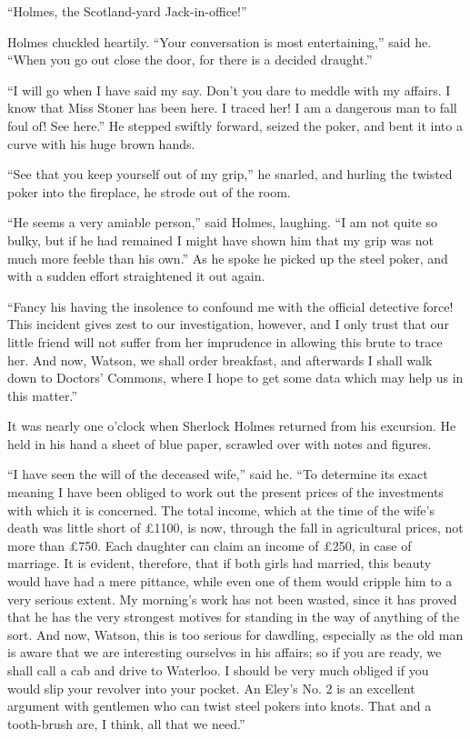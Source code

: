 “Holmes, the Scotland-yard Jack-in-office!”

Holmes chuckled heartily. “Your conversation is most
entertaining,” said he. “When you go out close the door, for
there is a decided draught.”

“I will go when I have said my say. Don’t you dare to
meddle with my affairs. I know that Miss Stoner has been
here. I traced her! I am a dangerous man to fall foul of!
See here.” He stepped swiftly forward, seized the poker, and
bent it into a curve with his huge brown hands.

“See that you keep yourself out of my grip,” he snarled,
and hurling the twisted poker into the fireplace, he strode out
of the room.

“He seems a very amiable person,” said Holmes, laughing.
“I am not quite so bulky, but if he had remained I might
have shown him that my grip was not much more feeble than
his own.” As he spoke he picked up the steel poker, and
with a sudden effort straightened it out again.

“Fancy his having the insolence to confound me with the
official detective force! This incident gives zest to our
investigation, however, and I only trust that our little friend will
not suffer from her imprudence in allowing this brute to trace
her. And now, Watson, we shall order breakfast, and afterwards
I shall walk down to Doctors’ Commons, where I hope
to get some data which may help us in this matter.”

\strut

It was nearly one o’clock when Sherlock Holmes returned
from his excursion. He held in his hand a sheet of blue paper,
scrawled over with notes and figures.

“I have seen the will of the deceased wife,” said he. “To
determine its exact meaning I have been obliged to work out
the present prices of the investments with which it is concerned.
The total income, which at the time of the wife’s
death was little short of £1100, is now, through the fall in
agricultural prices, not more than £750. Each daughter can
claim an income of £250, in case of marriage. It is evident,
therefore, that if both girls had married, this beauty would
have had a mere pittance, while even one of them would cripple
him to a very serious extent. My morning’s work has not
been wasted, since it has proved that he has the very strongest
motives for standing in the way of anything of the sort. And
now, Watson, this is too serious for dawdling, especially as
the old man is aware that we are interesting ourselves in his
affairs; so if you are ready, we shall call a cab and drive to
Waterloo. I should be very much obliged if you would slip
your revolver into your pocket. An Eley’s No. 2 is an excellent
argument with gentlemen who can twist steel pokers into
knots. That and a tooth-brush are, I think, all that we need.”

